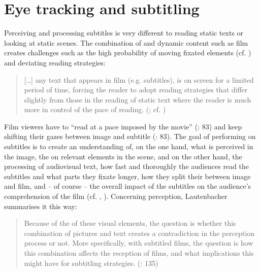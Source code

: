 \section{Eye tracking and subtitling}\label{sec:6.3}

Perceiving and processing subtitles is very different to reading static texts or looking at static scenes. The combination of  and dynamic content such as film creates challenges such as the high probability of moving fixated elements (cf. \citealt{Huff2010}) and deviating reading strategies:
\begin{quote}
[…] any text that appears in film (e.g. subtitles), is on screen for a limited period of time, forcing the reader to adopt reading strategies that differ slightly from those in the reading of static text where the reader is much more in control of the pace of reading. (\citealt{Kruger????}; cf. \citealt{Kruger2014})
\end{quote}
Film viewers have to “read at a pace imposed by the movie” (\citealt{schotter2012}: 83) and keep shifting their gazes between image and subtitle (\citeyear{schotter2012}: 83). The goal of performing  on subtitles is to create an understanding of, on the one hand, what is perceived in the image, the  on relevant elements in the scene, and on the other hand, the processing of audiovisual text, how fast and thoroughly the audiences read the subtitles and what parts they fixate longer, how they split their  between image and film, and – of course – the overall impact of the subtitles on the audience’s comprehension of the film (cf. \citealt{Fox2012}, \citealt{Kruger????}). Concerning perception, Lautenbacher summarises it this way:
\begin{quote}
Because of the  of these visual elements, the question is whether this combination of pictures and text creates a contradiction in the perception process or not. More specifically, with subtitled films, the question is how this combination affects the reception of films, and what implications this might have for subtitling strategies. (\citeyear{Lautenbacher2012}: 135)
\end{quote}
